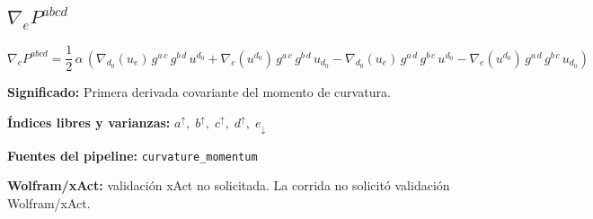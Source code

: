 \documentclass[11pt]{article}
\begin{document}
\subsection*{$ \nabla_e P^{abcd} $}
\begin{dmath*}[breakdepth={5}]
\nabla_e P^{abcd} = \frac{1}{2}\,\alpha\,\left(\nabla_{d_{0}}\!\left(u{}_{e}\right)\,g{}^{a\,c}\,g{}^{b\,d}\,u{}^{d_{0}} + \nabla_{e}\!\left(u{}^{d_{0}}\right)\,g{}^{a\,c}\,g{}^{b\,d}\,u{}_{d_{0}} - \nabla_{d_{0}}\!\left(u{}_{e}\right)\,g{}^{a\,d}\,g{}^{b\,c}\,u{}^{d_{0}} - \nabla_{e}\!\left(u{}^{d_{0}}\right)\,g{}^{a\,d}\,g{}^{b\,c}\,u{}_{d_{0}}\right)
\end{dmath*}
\par\vspace{1.2\baselineskip}\noindent
\begin{minipage}{\linewidth}
\textbf{Significado:} Primera derivada covariante del momento de curvatura.\par
\textbf{Índices libres y varianzas:} $ a^{\uparrow},\;b^{\uparrow},\;c^{\uparrow},\;d^{\uparrow},\;e_{\downarrow} $\par
\textbf{Fuentes del pipeline:} \texttt{curvature\_momentum}\par
\textbf{Wolfram/xAct:} validación xAct no solicitada. La corrida no solicitó validación Wolfram/xAct.\par
\end{minipage}
\end{document}
